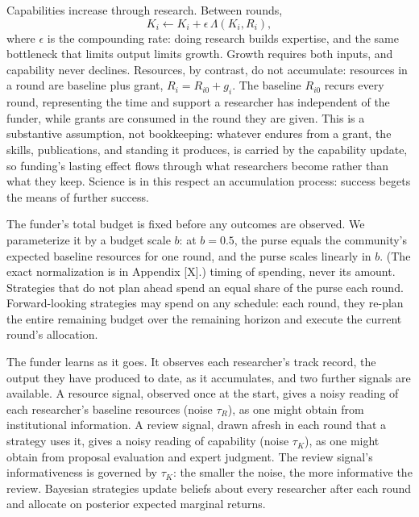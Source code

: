 \documentclass[article, 11pt, reqno]{amsart}
\theoremstyle{named}
\begin{document}
Capabilities increase through research. Between rounds,
\[
K_i \leftarrow K_i + \epsilon\,\Lambda(K_i, R_i),
\]
where $\epsilon$ is the compounding rate: doing research builds expertise, and the same
bottleneck that limits output limits growth. Growth requires both inputs, and capability
never declines. Resources, by contrast, do not accumulate: resources in a round are
baseline plus grant, $R_i = R_{i0} + g_i$. The baseline $R_{i0}$ recurs every round,
representing the time and support a researcher has independent of the funder, while grants
are consumed in the round they are given. This is a substantive assumption, not
bookkeeping: whatever endures from a grant, the skills, publications, and standing it
produces, is carried by the capability update, so funding's lasting effect flows through
what researchers become rather than what they keep. Science is in this respect an
accumulation process: success begets the means of further success.

The funder's total budget is fixed before any outcomes are observed. We parameterize it by
a budget scale $b$: at $b = 0.5$, the purse equals the community's expected baseline
resources for one round, and the purse scales linearly in $b$. (The exact normalization is
in Appendix [X].) %
timing of spending, never its amount. Strategies that do not plan ahead spend an equal
share of the purse each round. Forward-looking strategies may spend on any schedule: each
round, they re-plan the entire remaining budget over the remaining horizon and execute the
current round's allocation.

The funder learns as it goes. It observes each researcher's track record, the output they
have produced to date, as it accumulates, and two further signals are available. A resource
signal, observed once at the start, gives a noisy reading of each researcher's baseline
resources (noise $\tau_R$), as one might obtain from institutional information. A review
signal, drawn afresh in each round that a strategy uses it, gives a noisy reading of
capability (noise $\tau_K$), as one might obtain from proposal evaluation and expert
judgment. The review signal's informativeness is governed by $\tau_K$: the smaller the
noise, the more informative the review. Bayesian strategies update beliefs about every
researcher after each round and allocate on posterior expected marginal returns.
\end{document}
